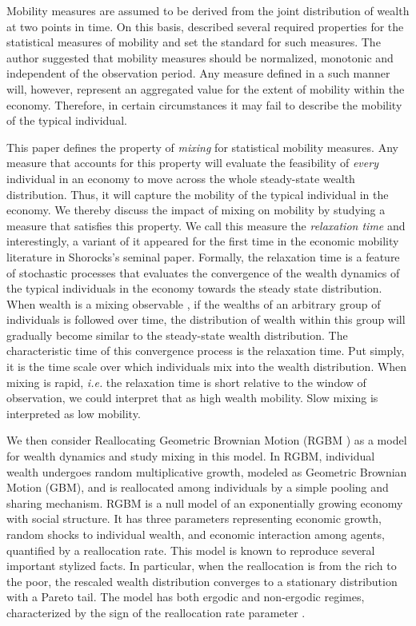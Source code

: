 \documentclass[11pt]{article}
\newcommand{\ie}{{\it i.e.}\xspace}
\numberwithin{equation}{section}
\begin{document}
Mobility measures are assumed to be derived from the joint distribution of wealth at two points in time. On this basis, \citet{Shorrocks1978} described several required properties for the statistical measures of mobility and set the standard for such measures. The author suggested that mobility measures should be normalized, monotonic and independent of the observation period. Any measure defined in a such manner will, however, represent an aggregated value for the extent of mobility within the economy. Therefore, in certain circumstances it may fail to describe the mobility of the typical individual.

This paper defines the property of \textit{mixing} for statistical mobility measures. Any measure that accounts for this property will evaluate the feasibility of \textit{every} individual in an economy to move across the whole steady-state wealth distribution. Thus, it will capture the mobility of the typical individual in the economy. We thereby discuss the impact of mixing on mobility by studying a measure that satisfies this property. We call this measure the \textit{relaxation time} and interestingly, a variant of it appeared for the first time in the economic mobility literature in Shorocks's seminal paper. Formally, the relaxation time is a feature of stochastic processes that evaluates the convergence of the wealth dynamics of the typical individuals in the economy towards the steady state distribution. When wealth is a mixing observable \citep{PetersAdamou2018c}, if the wealths of an arbitrary group of individuals is followed over time, the distribution of wealth within this group will gradually become similar to the steady-state wealth distribution. The characteristic time of this convergence process is the relaxation time. Put simply, it is the time scale over which individuals mix into the wealth distribution. When mixing is rapid, \ie the relaxation time is short relative to the window of observation, we could interpret that as high wealth mobility. Slow mixing is interpreted as low mobility.

We then consider Reallocating Geometric Brownian Motion (RGBM \citep{MarsiliMaslovZhang1998,LiuSerota2017,BermanPetersAdamou2019}) as a model for wealth dynamics and study mixing in this model. In RGBM, individual wealth undergoes random multiplicative growth, modeled as Geometric Brownian Motion (GBM), and is reallocated among individuals by a simple pooling and sharing mechanism. RGBM is a null model of an exponentially growing economy with social structure. It has three parameters representing economic growth, random shocks to individual wealth, and economic interaction among agents, quantified by a reallocation rate. This model is known to reproduce several important stylized facts. In particular, when the reallocation is from the rich to the poor, the rescaled wealth distribution converges to a stationary distribution with a Pareto tail. The model has both ergodic and non-ergodic regimes, characterized by the sign of the reallocation rate parameter \citep{BermanPetersAdamou2019}.
\end{document}
